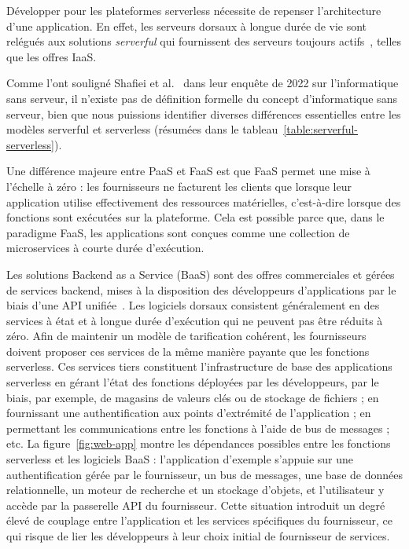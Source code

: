 Développer pour les plateformes serverless nécessite de repenser l'architecture d'une application. En effet, les serveurs dorsaux à longue durée de vie sont relégués aux solutions \textit{serverful} qui fournissent des serveurs toujours actifs~\cite{mateiTransitionServerfullServerless2020}, telles que les offres IaaS.

Comme l'ont souligné Shafiei et al.~\cite{shafieiServerlessComputingSurvey2021} dans leur enquête de 2022 sur l'informatique sans serveur, il n'existe pas de définition formelle du concept d'informatique sans serveur, bien que nous puissions identifier diverses différences essentielles entre les modèles serverful et serverless (résumées dans le tableau~\ref{table:serverful-serverless}).

Une différence majeure entre PaaS et FaaS est que FaaS permet une mise à l'échelle à zéro : les fournisseurs ne facturent les clients que lorsque leur application utilise effectivement des ressources matérielles, c'est-à-dire lorsque des fonctions sont exécutées sur la plateforme. Cela est possible parce que, dans le paradigme FaaS, les applications sont conçues comme une collection de microservices à courte durée d'exécution.

Les solutions Backend as a Service (BaaS) sont des offres commerciales et gérées de services backend, mises à la disposition des développeurs d'applications par le biais d'une API unifiée~\cite{mikeroberts2018serverless}. Les logiciels dorsaux consistent généralement en des services à état et à longue durée d'exécution qui ne peuvent pas être réduits à zéro. Afin de maintenir un modèle de tarification cohérent, les fournisseurs doivent proposer ces services de la même manière payante que les fonctions serverless. Ces services tiers constituent l'infrastructure de base des applications serverless en gérant l'état des fonctions déployées par les développeurs, par le biais, par exemple, de magasins de valeurs clés ou de stockage de fichiers ; en fournissant une authentification aux points d'extrémité de l'application ; en permettant les communications entre les fonctions à l'aide de bus de messages ; etc. La figure~\ref{fig:web-app} montre les dépendances possibles entre les fonctions serverless et les logiciels BaaS : l'application d'exemple s'appuie sur une authentification gérée par le fournisseur, un bus de messages, une base de données relationnelle, un moteur de recherche et un stockage d'objets, et l'utilisateur y accède par la passerelle API du fournisseur. Cette situation introduit un degré élevé de couplage entre l'application et les services spécifiques du fournisseur, ce qui risque de lier les développeurs à leur choix initial de fournisseur de services.

